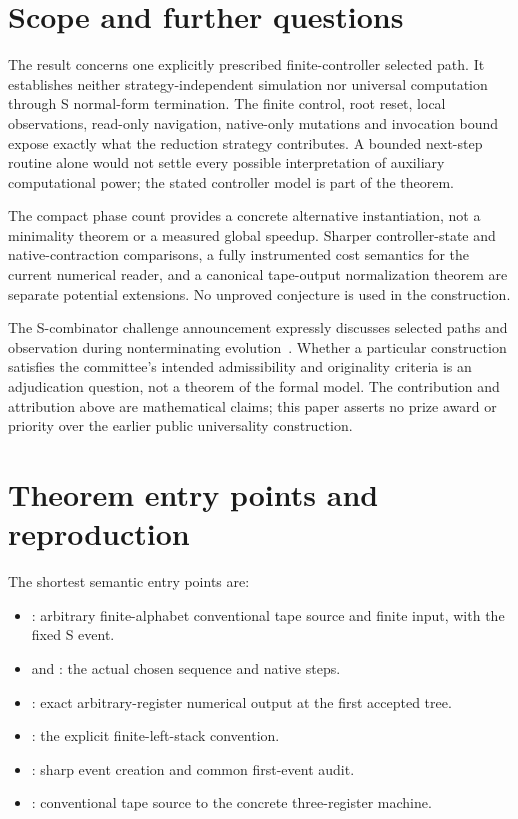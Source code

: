 \section{Scope and further questions}

The result concerns one explicitly prescribed finite-controller selected path.
It establishes neither strategy-independent simulation nor universal computation
through S normal-form termination. The finite control, root reset, local
observations, read-only navigation, native-only mutations and invocation bound
expose exactly what the reduction strategy contributes. A bounded next-step
routine alone would not settle every possible interpretation of auxiliary
computational power; the stated controller model is part of the theorem.

The compact phase count provides a concrete alternative instantiation, not a
minimality theorem or a measured global speedup. Sharper controller-state and
native-contraction comparisons, a fully instrumented cost semantics for the
current numerical reader, and a canonical tape-output normalization theorem
are separate potential extensions. No unproved conjecture is used in the
construction.

The S-combinator challenge announcement expressly discusses selected paths and
observation during nonterminating evolution~\cite{challenge}. Whether a
particular construction satisfies the committee's intended admissibility and
originality criteria is an adjudication question, not a theorem of the formal
model. The contribution and attribution above are mathematical claims; this
paper asserts no prize award or priority over the earlier public universality
construction.

\clearpage
\appendix
\section{Theorem entry points and reproduction}\label{app:reproduce}

The shortest semantic entry points are:
\begin{itemize}
\item {}: arbitrary finite-alphabet
conventional tape source and finite input, with the fixed S event.
\item {} and
: the actual chosen sequence and native steps.
\item {}: exact arbitrary-register
numerical output at the first accepted tree.
\item {}: the
explicit finite-left-stack convention.
\item {}: sharp event
creation and common first-event audit.
\item {}: conventional tape source to
the concrete three-register machine.
\end{itemize}

